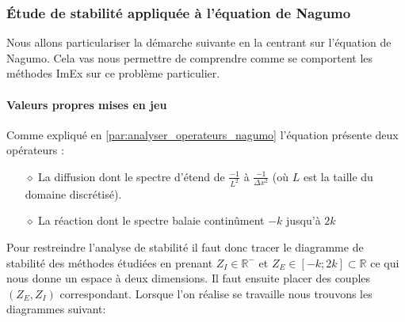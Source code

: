 \subsubsection{Étude de stabilité appliquée à l'équation de Nagumo}
    Nous allons particulariser la démarche suivante en la centrant sur l'équation de Nagumo. Cela vas nous permettre de comprendre 
    comme se comportent les méthodes ImEx sur ce problème particulier.
    \paragraph{Valeurs propres mises en jeu}
        Comme expliqué en \ref{par:analyser_operateurs_nagumo} l'équation présente deux opérateurs : 
        \begin{itemize}
            \item[$\diamond$] La diffusion dont le spectre d'étend de $\frac{-1}{L^2}$ à $\frac{-1}{\Delta x^2}$ (où $L$ est la taille du domaine discrétisé).
            \item[$\diamond$] La réaction dont le spectre balaie continûment $-k$ jusqu'à $2k$
        \end{itemize}
        Pour restreindre l'analyse de stabilité il faut donc tracer le diagramme de stabilité des méthodes étudiées en prenant $Z_I \in \mathbb{R}^-$ 
        et $Z_E \in [-k;2k] \subset \mathbb{R}$ ce qui nous donne un espace à deux dimensions. Il faut ensuite placer des couples $(Z_E,Z_I)$ correspondant.
        Lorsque l'on réalise se travaille nous trouvons les diagrammes suivant: 
